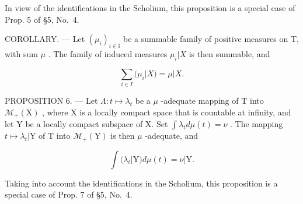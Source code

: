 In view of the identifications in the Scholium, this proposition is a special case of Prop. 5 of §5, No.~4.

COROLLARY. --- Let \((\mu_{i})_{i\in\mathbb{I}}\) be a summable family of positive measures on T, with sum \(\mu\) . The family of induced measures \(\mu_{i}|X\) is then summable, and

\[
\sum_ {i \in I} (\mu_ {i} | X) = \mu | X.\tag{9}
\]

PROPOSITION 6. --- Let \(\Lambda: t \mapsto \lambda_t\) be a \(\mu\) -adequate mapping of T into \(\mathcal{M}_+(\mathrm{X})\) , where X is a locally compact space that is countable at infinity, and let Y be a locally compact subspace of X. Set \(\int \lambda_t d\mu(t) = \nu\) . The mapping \(t \mapsto \lambda_t|\mathrm{Y}\) of T into \(\mathcal{M}_+(\mathrm{Y})\) is then \(\mu\) -adequate, and

\[
\int (\lambda_ {t} | \mathrm{Y}) d \mu (t) = \nu | \mathrm{Y}.\tag{10}
\]

Taking into account the identifications in the Scholium, this proposition is a special case of Prop. 7 of §5, No.~4.

